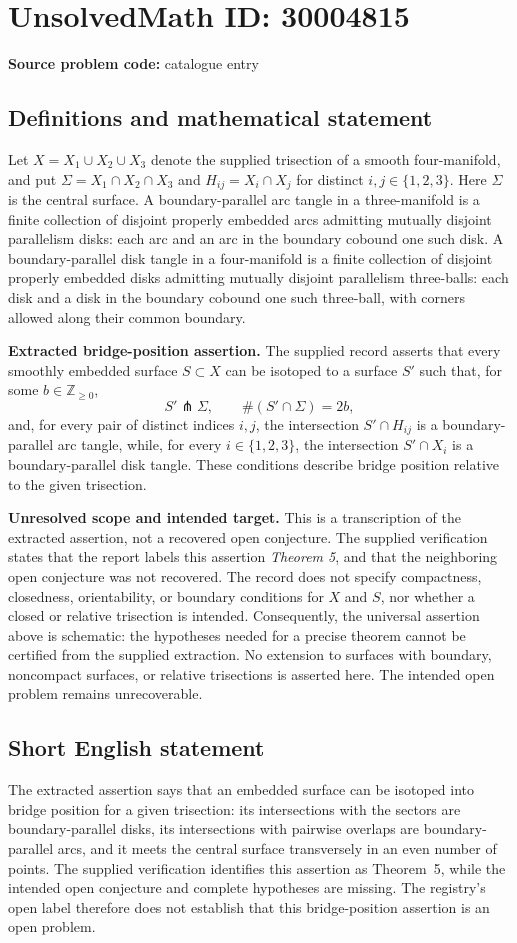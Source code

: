 \documentclass[11pt]{article}
\begin{document}
\section*{UnsolvedMath ID: 30004815}
\textbf{Source problem code:} catalogue entry
\subsection{Definitions and mathematical statement}
Let \(X=X_1\cup X_2\cup X_3\) denote the supplied trisection of a smooth four-manifold, and put \(\Sigma=X_1\cap X_2\cap X_3\) and \(H_{ij}=X_i\cap X_j\) for distinct \(i,j\in\{1,2,3\}\). Here \(\Sigma\) is the central surface. A boundary-parallel arc tangle in a three-manifold is a finite collection of disjoint properly embedded arcs admitting mutually disjoint parallelism disks: each arc and an arc in the boundary cobound one such disk. A boundary-parallel disk tangle in a four-manifold is a finite collection of disjoint properly embedded disks admitting mutually disjoint parallelism three-balls: each disk and a disk in the boundary cobound one such three-ball, with corners allowed along their common boundary.

\textbf{Extracted bridge-position assertion.} The supplied record asserts that every smoothly embedded surface \(S\subset X\) can be isotoped to a surface \(S'\) such that, for some \(b\in\mathbb Z_{\geq 0}\),
\[
S'\pitchfork\Sigma,\qquad \#(S'\cap\Sigma)=2b,
\]
and, for every pair of distinct indices \(i,j\), the intersection \(S'\cap H_{ij}\) is a boundary-parallel arc tangle, while, for every \(i\in\{1,2,3\}\), the intersection \(S'\cap X_i\) is a boundary-parallel disk tangle. These conditions describe bridge position relative to the given trisection.

\textbf{Unresolved scope and intended target.} This is a transcription of the extracted assertion, not a recovered open conjecture. The supplied verification states that the report labels this assertion \emph{Theorem 5}, and that the neighboring open conjecture was not recovered. The record does not specify compactness, closedness, orientability, or boundary conditions for \(X\) and \(S\), nor whether a closed or relative trisection is intended. Consequently, the universal assertion above is schematic: the hypotheses needed for a precise theorem cannot be certified from the supplied extraction. No extension to surfaces with boundary, noncompact surfaces, or relative trisections is asserted here. The intended open problem remains unrecoverable.
\subsection{Short English statement}
The extracted assertion says that an embedded surface can be isotoped into bridge position for a given trisection: its intersections with the sectors are boundary-parallel disks, its intersections with pairwise overlaps are boundary-parallel arcs, and it meets the central surface transversely in an even number of points. The supplied verification identifies this assertion as Theorem~5, while the intended open conjecture and complete hypotheses are missing. The registry's open label therefore does not establish that this bridge-position assertion is an open problem.
\end{document}
